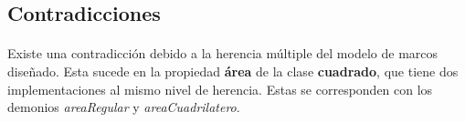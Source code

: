 \documentclass[10pt, a4paper,spanish]{article}
\begin{document}
    \subsection{Contradicciones}

      \paragraph{}
      Existe una contradicción debido a la herencia múltiple del modelo de marcos diseñado. Esta sucede en la propiedad \textbf{área} de la clase \textbf{cuadrado}, que tiene dos implementaciones al mismo nivel de herencia. Estas se corresponden con los demonios \emph{areaRegular} y \emph{areaCuadrilatero}.
\end{document}
